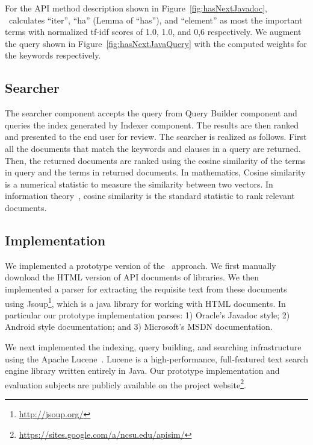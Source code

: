 For the API method description  shown in Figure~\ref{fig:hasNextJavadoc}, \tool\ calculates ``iter'', ``ha'' (Lemma of ``has''), and ``element'' as most the important terms with normalized tf-idf scores of 1.0, 1.0, and 0,6 respectively. We augment the query shown in Figure~\ref{fig:hasNextJavaQuery} with the computed weights for the keywords respectively.

\subsection{Searcher}
\label{sub:approach_searcher}

The searcher component accepts the query from Query Builder component and queries the index generated by Indexer component.
The results are then ranked and presented to the end user for review.
The searcher is realized as follows. 
First all the documents that match the keywords and clauses in a query are returned.
Then, the returned documents are ranked using the cosine similarity\cite{singhal2001modern} of the terms in query and the terms in returned documents. In mathematics, Cosine similarity is a numerical statistic to measure the similarity between two vectors. 
In information theory~\cite{manning2008introduction}, cosine similarity is the standard statistic to rank relevant documents.




    


\subsection{Implementation}
\label{sub:Approach_implementation}

We implemented a prototype version of the \tool\ approach.
We first manually download the HTML version of API documents of libraries. 
We then implemented a parser for extracting the requisite text from these documents using 
Jsoup\footnote{\url{http://jsoup.org/}}, which is a java library for working with HTML documents.
In particular our prototype implementation parses: 
1) Oracle's Javadoc style;
2) Android style documentation; and
3) Microsoft's  MSDN documentation.

We next implemented the indexing, query building, and searching infrastructure using the Apache Lucene~\cite{lucene}.
Lucene is a high-performance, full-featured text search engine library written entirely in Java.
Our prototype implementation and evaluation subjects are publicly available on the project website\footnote{\url{https://sites.google.com/a/ncsu.edu/apisim/}}. 
